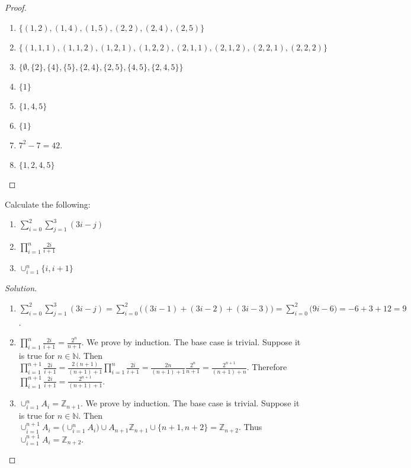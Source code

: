         \begin{proof}
        \vspace{-\topsep}
        \
        \begin{enumerate}
            \item $\{(1,2),(1,4),(1,5),(2,2),(2,4),(2,5)\}$
            \item $\{(1,1,1),(1,1,2),(1,2,1),(1,2,2),(2,1,1),(2,1,2),(2,2,1),(2,2,2)\}$
            \item $\big\{\emptyset,\{2\},\{4\},\{5\},\{2,4\},\{2,5\},\{4,5\},\{2,4,5\}\big\}$
            \item $\{1\}$
            \item $\{1,4,5\}$
            \item $\{1\}$
            \item $7^2-7 = 42$.
            \item $\{1,2,4,5\}$
        \end{enumerate}
        \end{proof}
        \begin{problem}
        Calculate the following:
        \begin{enumerate}
            \item $\sum_{i=0}^{2}\sum_{j=1}^{3}(3i-j)$
            \item $\prod_{i=1}^{n} \frac{2i}{i+1}$
            \item $\cup_{i=1}^{n} \{i,i+1\}$
        \end{enumerate}
        \end{problem}
        \begin{proof}[Solution]
        \par
        \begin{enumerate}
            \item $\sum_{i=0}^{2}\sum_{j=1}^{3}(3i-j)=\sum_{i=0}^{2}\big((3i-1)+(3i-2)+(3i-3)\big)=\sum_{i=0}^{2}\big(9i-6\big)=-6+3+12=9$.
            \item   $\prod_{i=1}^{n} \frac{2i}{i+1}= \frac{2^n}{n+1}$. We prove
                    by induction. The base case is trivial. Suppose it is true
                    for $n\in \mathbb{N}$. Then $\prod_{i=1}^{n+1} \frac{2i}{i+1} = \frac{2(n+1)}{(n+1)+1}\prod_{i=1}^{n}\frac{2i}{i+1}=\frac{2n}{(n+1)+1}\frac{2^n}{n+1} = \frac{2^{n+1}}{(n+1)+n}$. Therefore $\prod_{i=1}^{n+1} \frac{2i}{i+1} = \frac{2^{n+1}}{(n+1)+1}$.
            \item $\cup_{i=1}^{n} A_i = \mathbb{Z}_{n+1}$. We prove by induction. The base case is trivial. Suppose it is true for $n\in \mathbb{N}$. Then $\cup_{i=1}^{n+1}A_i = \big(\cup_{i=1}^{n}A_{i}\big) \cup A_{n+1}\mathbb{Z}_{n+1}\cup\{n+1,n+2\}=\mathbb{Z}_{n+2}$. Thus $\cup_{i=1}^{n+1} A_{i} = \mathbb{Z}_{n+2}$.
        \end{enumerate}
        \end{proof}
